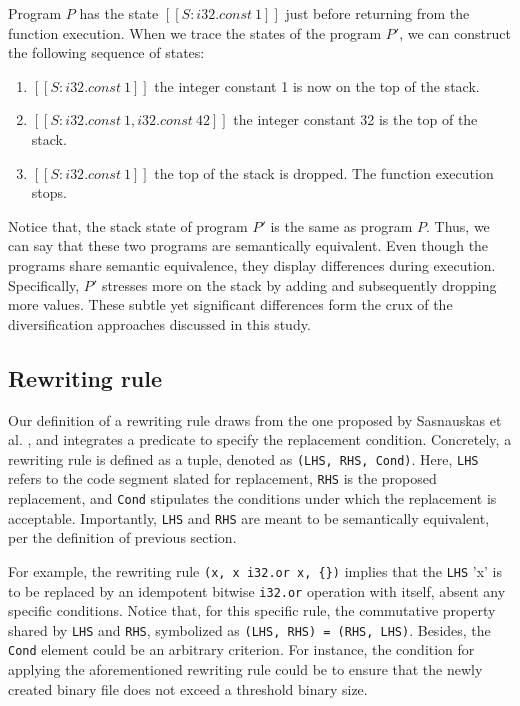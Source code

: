 \documentclass[sigplan,screen]{acmart}
\begin{document}
Program $P$ has the state $[[S:i32.const\ 1]]$ just before returning from the function execution.
When we trace the states of the program $P'$, we can construct the following sequence of states:
\begin{enumerate}
    \item $[[S: i32.const\ 1]]$ the integer constant 1 is now on the top of the stack.
    \item $[[S: i32.const\ 1, i32.const\ 42]]$ the integer constant 32 is  the top of the stack.
    \item $[[S: i32.const\ 1]]$ the top of the stack is dropped. The function execution stops.
\end{enumerate}
Notice that, the stack state of program $P'$ is the same as program $P$.
Thus, we can say that these two programs are semantically equivalent.
Even though the programs share semantic equivalence, they display differences during execution. 
Specifically, $P'$ stresses more on the stack by adding and subsequently dropping more values.
These subtle yet significant differences form the crux of the diversification approaches discussed in this study.






\subsection{Rewriting rule}
\label{rewriting}

Our definition of a rewriting rule draws from the one proposed by Sasnauskas et al. \cite{2017arXiv171104422S}, and integrates a predicate to specify the replacement condition.
Concretely, a rewriting rule is defined as a tuple, denoted as \texttt{(LHS, RHS, Cond)}. Here, \texttt{LHS} refers to the code segment slated for replacement, \texttt{RHS} is the proposed replacement, and \texttt{Cond} stipulates the conditions under which the replacement is acceptable.
Importantly, \texttt{LHS} and \texttt{RHS} are meant to be semantically equivalent, per the definition of previous section.


For example, the rewriting rule \texttt{(x,\ x\ i32.or\ x, \{\})} implies that the \texttt{LHS} 'x' is to be replaced by an idempotent bitwise \texttt{i32.or} operation with itself, absent any specific conditions.
Notice that, for this specific rule, the commutative property shared by \texttt{LHS} and \texttt{RHS}, symbolized as \texttt{(LHS, RHS) = (RHS, LHS)}.
Besides, the \texttt{Cond} element could be an arbitrary criterion. 
For instance, the condition for applying the aforementioned rewriting rule could be to ensure that the newly created binary file does not exceed a threshold binary size.
\end{document}
